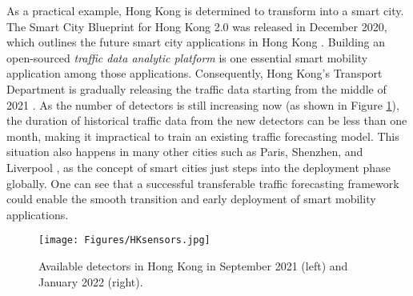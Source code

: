 \documentclass[sigconf]{acmart}
\theoremstyle{definition}
\begin{document}
As a practical example, Hong Kong is determined to transform into a smart city. The Smart City Blueprint for Hong Kong 2.0 was released in December 2020, which outlines the future smart city applications in Hong Kong \cite{HKsmart}. Building an open-sourced \textit{traffic data analytic platform} is one essential smart mobility application among those applications. Consequently, Hong Kong's Transport Department is gradually releasing the traffic data starting from the middle of 2021 \cite{HKdata}. As the number of detectors is still increasing now (as shown in Figure \ref{fig:HKsensor}), the duration of historical traffic data from the new detectors can be less than one month, making it impractical to train an existing traffic forecasting model. This situation also happens in many other cities such as Paris, Shenzhen, and Liverpool \cite{vivacitylabs2022}, as the concept of smart cities just steps into the deployment phase globally. One can see that a successful transferable traffic forecasting framework could enable the smooth transition and early deployment of smart mobility applications.













\begin{figure}[t]
    \centering
    \texttt{[image: Figures/HKsensors.jpg]}
    \caption{Available detectors in Hong Kong in September 2021 (left) and January 2022 (right).}
    \label{fig:HKsensor}
\end{figure}
\end{document}
